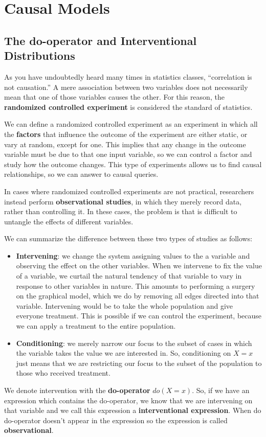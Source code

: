 \chapter{Causal Models}
\section{The do-operator and Interventional Distributions}
As you have undoubtedly heard many times in statistics classes, “correlation is
not causation.” A mere association between two variables does not necessarily
mean that one of those variables causes the other. For this reason, the
\textbf{randomized controlled experiment} is considered the standard of statistics.

We can define a randomized controlled experiment as an experiment in which all
the \textbf{factors} that influence the outcome of the experiment are either
static, or vary at random, except for one. This implies that any change in the
outcome variable must be due to that one input variable, so we can control a factor
and study how the outcome changes. This type of experiments allows us to find causal
relationships, so we can answer to causal queries.

In cases where randomized controlled experiments are not practical, researchers
instead perform \textbf{observational studies}, in which they merely record data,
rather than controlling it. In these cases, the problem is that is difficult to
untangle the effects of different variables.

We can summarize the difference between these two types of studies as follows:
\begin{itemize}
      \item \textbf{Intervening}: we change the system assigning values to the a
            variable and observing the effect on the other variables. When we
            intervene to fix the value of a variable, we curtail the natural
            tendency of that variable to vary in response to other variables in
            nature. This amounts to performing a surgery on the graphical model,
            which we do by removing all edges directed into that variable.
            Intervening would be to take the whole population and give everyone
            treatment. This is possible if we can control the experiment, because
            we can apply a treatment to the entire population.
      \item \textbf{Conditioning}: we merely narrow our focus to the subset of
            cases in which the variable takes the value we are interested in.
            So, conditioning on $X = x$ just means that we are restricting our
            focus to the subset of the population to those who received treatment.
\end{itemize}
We denote intervention with the \textbf{do-operator} $do(X=x)$. So, if we have
an expression which contains the do-operator, we know that we are intervening
on that variable and we call this expression a \textbf{interventional expression}.
When do do-operator doesn't appear in the expression so the expression is called
\textbf{observational}.

